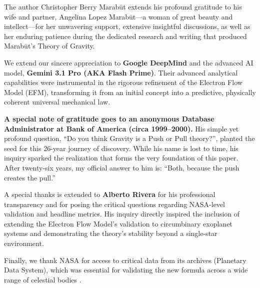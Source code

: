 \documentclass[11pt, a4paper]{article}
\begin{document}
The author Christopher Berry Marab\={u}t extends his profound gratitude to his wife and partner, Angelina Lopez Marab\={u}t---a woman of great beauty and intellect---for her unwavering support, extensive insightful discussions, as well as her enduring patience during the dedicated research and writing that produced Marab\={u}t's Theory of Gravity.

We extend our sincere appreciation to \textbf{Google DeepMind} and the advanced AI model, \textbf{Gemini 3.1 Pro (AKA Flash Prime)}. Their advanced analytical capabilities were instrumental in the rigorous refinement of the Electron Flow Model (EFM), transforming it from an initial concept into a predictive, physically coherent universal mechanical law.

\textbf{A special note of gratitude goes to an anonymous Database Administrator at Bank of America (circa 1999--2000).} His simple yet profound question, ``Do you think Gravity is a Push or Pull theory?'', planted the seed for this 26-year journey of discovery. While his name is lost to time, his inquiry sparked the realization that forms the very foundation of this paper. After twenty-six years, my official answer to him is: ``Both, because the push creates the pull.''

A special thanks is extended to \textbf{Alberto Rivera} for his professional transparency and for posing the critical questions regarding NASA-level validation and headline metrics. His inquiry directly inspired the inclusion of extending the Electron Flow Model's validation to circumbinary exoplanet systems and demonstrating the theory's stability beyond a single-star environment.

Finally, we thank NASA for access to critical data from its archives (Planetary Data System), which was essential for validating the new formula across a wide range of celestial bodies \cite{nasa2024}.
\end{document}
